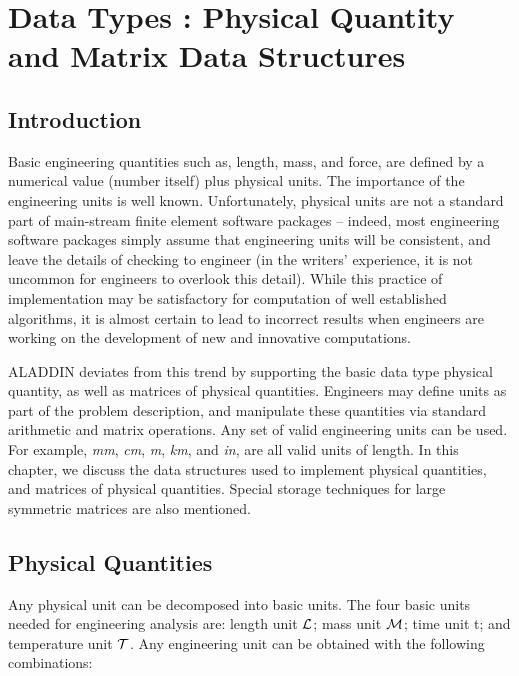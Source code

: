 \chapter{Data Types : Physical Quantity and Matrix Data Structures}

\section{Introduction}

\vspace{0.15 in}
\noindent\hspace{0.5 in}
Basic engineering quantities such as, length, mass, and force,
are defined by a numerical value (number itself) plus physical units.
The importance of the engineering units is well known.
Unfortunately, physical units are not a standard part of main-stream finite element
software packages -- indeed, most engineering software packages simply
assume that engineering units will be consistent,
and leave the details of checking to engineer (in the writers' experience,
it is not uncommon for engineers to overlook this detail).
While this practice of implementation may be satisfactory for
computation of well established algorithms, it is almost certain
to lead to incorrect results when engineers are working on the
development of new and innovative computations.

\vspace{0.15 in}
\noindent\hspace{0.5 in}
ALADDIN deviates from this trend by supporting
the basic data type physical quantity,
as well as matrices of physical quantities.
Engineers may define units as part of the problem description,
and manipulate these quantities via standard arithmetic and matrix operations.
Any set of valid engineering units can be used.
For example, {\em mm}, {\em cm}, {\em m}, {\em km}, and {\em in},
are all valid units of length.
In this chapter, we discuss the data structures used to
implement physical quantities, and matrices of physical quantities.
Special storage techniques for large symmetric matrices are also mentioned.

\section{Physical Quantities}

\vspace{0.15 in}
\noindent\hspace{0.5 in}
Any physical unit can be decomposed into basic units.
The four basic units needed for engineering analysis are: 
length unit $\cal L$; mass unit $\cal M$; time unit t; and temperature unit $\cal T $.
Any engineering unit can be obtained with the following combinations:

